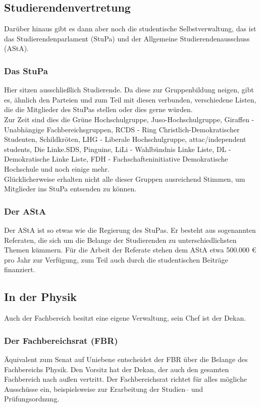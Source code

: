 \subsection{Studierendenvertretung}
Darüber hinaus gibt es dann aber noch die studentische Selbstverwaltung, das ist das Studierendenparlament (StuPa) und der Allgemeine Studierendenausschuss (AStA).

\subsubsection{Das StuPa}
Hier sitzen ausschlie\ss lich Studierende. Da diese zur Gruppenbildung neigen, gibt es, ähnlich den Parteien und zum Teil mit diesen verbunden, verschiedene Listen, die die Mitglieder des StuPas stellen oder dies gerne würden.\\
Zur Zeit sind dies die Grüne Hochschulgruppe, Juso-Hochschulgruppe, Giraffen - Unabhängige Fachbereichsgruppen, RCDS - Ring Christlich-Demokratischer Studenten, Schildkröten, LHG - Liberale Hochschulgruppe, attac/independent students, Die Linke.SDS, Pinguine, LiLi - Wahlbündnis Linke Liste, DL - Demokratische Linke Liste, FDH - Fachschafteninitiative Demokratische Hochschule und noch einige mehr.\\
Glücklicherweise erhalten nicht alle dieser Gruppen ausreichend Stimmen, um Mitglieder ins StuPa entsenden zu können.

\subsubsection{Der AStA}
Der AStA ist so etwas wie die Regierung des StuPas. Er besteht aus sogenannten Referaten, die sich um die Belange der Studierenden zu unterschiedlichsten Themen kümmern. Für die Arbeit der Referate stehen dem AStA etwa 500.000 \euro{} pro Jahr zur Verfügung, zum Teil auch durch die studentischen Beiträge finanziert.

\subsection{In der Physik}
Auch der Fachbereich besitzt eine eigene Verwaltung, sein Chef ist der Dekan.

\subsubsection{Der Fachbereichsrat (FBR)}
Äquivalent zum Senat auf Uniebene entscheidet der FBR über die Belange des Fachbereichs Physik. Den Vorsitz hat der Dekan, der auch den gesamten Fachbereich nach au\ss en vertritt. Der Fachbereichsrat richtet für alles mögliche Ausschüsse ein, beispielsweise zur Erarbeitung der Studien-- und Prüfungsordnung.

